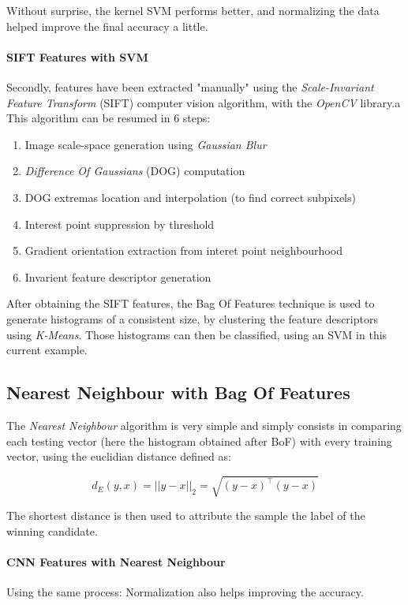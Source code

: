 \documentclass[conference]{IEEEtran}
\begin{document}
Without surprise, the kernel SVM performs better, and normalizing the data helped improve the final accuracy a little.

\paragraph{SIFT Features with SVM}
Secondly, features have been extracted "manually" using the \emph{Scale-Invariant Feature Transform} (SIFT) computer vision algorithm, with the \emph{OpenCV} library.a
This algorithm can be resumed in 6 steps:

\begin{enumerate}
\item Image scale-space generation using \emph{Gaussian Blur}
\item \emph{Difference Of Gaussians} (DOG) computation
\item DOG extremas location and interpolation (to find correct subpixels)
\item Interest point suppression by threshold
\item Gradient orientation extraction from interet point neighbourhood
\item Invarient feature descriptor generation
\end{enumerate}

After obtaining the SIFT features, the Bag Of Features technique is used to generate histograms of a consistent size, by clustering the feature descriptors using \emph{K-Means}.
Those histograms can then be classified, using an SVM in this current example.

\subsection{Nearest Neighbour with Bag Of Features}
The \emph{Nearest Neighbour} algorithm is very simple and simply consists in comparing each testing vector (here the histogram obtained after BoF) with every training vector, using the euclidian distance defined as:

\begin{equation}
    d_E(y,x) = ||y - x||_2 = \sqrt{(y - x)^\intercal(y-x)}
\end{equation}

The shortest distance is then used to attribute the sample the label of the winning candidate.

\paragraph{CNN Features with Nearest Neighbour}
    Using the same process:
Normalization also helps improving the accuracy.
\end{document}
